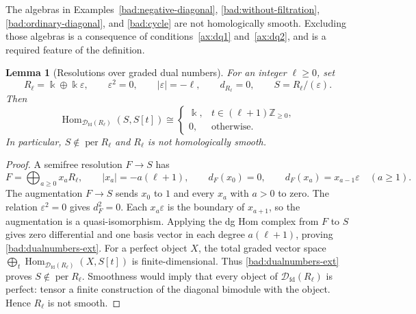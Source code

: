 \documentclass[11pt,a4paper]{article}
\newcommand{\D}{\mathcal D}
\newcommand{\ZZ}{\mathbb{Z}}
\DeclareMathOperator{\fd}{fd}
\DeclareMathOperator{\Hom}{Hom}
\DeclareMathOperator{\per}{per}
\theoremstyle{plain}
\newtheorem{lemma}[theorem]{Lemma}
\theoremstyle{definition}
\numberwithin{equation}{section}
\begin{document}
The algebras in Examples~\ref{bad:negative-diagonal},
\ref{bad:without-filtration}, \ref{bad:ordinary-diagonal}, and
\ref{bad:cycle} are not homologically smooth. Excluding those algebras is a
consequence of conditions~\ref{ax:dq1} and~\ref{ax:dq2}, and is a
required feature of the definition.

\begin{lemma}[Resolutions over graded dual numbers]\label{bad:dualnumbers-resolution}
For an integer $\ell\geq0$, set
\begin{equation}\label{bad:dualnumbers-algebra}
 R_\ell=\Bbbk\oplus\Bbbk\varepsilon,
 \qquad\varepsilon^2=0,\qquad |\varepsilon|=-\ell,
 \qquad d_{R_\ell}=0,\qquad S=R_\ell/(\varepsilon).
\end{equation}
Then
\begin{equation}\label{bad:dualnumbers-ext}
 \Hom_{\D_{\fd}(R_\ell)}(S,S[t])\cong
 \begin{cases}
 \Bbbk,&t\in(\ell+1)\ZZ_{\geq0},\\
 0,&\text{otherwise}.
 \end{cases}
\end{equation}
In particular, $S\notin\per R_\ell$ and $R_\ell$ is not
homologically smooth.
\end{lemma}
\begin{proof}
A semifree resolution $F\to S$ has
\begin{equation}\label{bad:dualnumbers-semifree}
 F=\bigoplus_{a\geq0}x_aR_\ell,\qquad
 |x_a|=-a(\ell+1),\qquad
 d_F(x_0)=0,\qquad d_F(x_a)=x_{a-1}\varepsilon\quad(a\geq1).
\end{equation}
The augmentation $F\to S$ sends $x_0$ to $1$ and every $x_a$ with
$a>0$ to zero. The relation $\varepsilon^2=0$ gives $d_F^2=0$.
Each $x_a\varepsilon$ is the boundary of $x_{a+1}$, so the
augmentation is a quasi-isomorphism. Applying the dg Hom complex
from $F$ to $S$ gives zero differential and one basis vector in each
degree $a(\ell+1)$, proving \eqref{bad:dualnumbers-ext}.
For a perfect object $X$, the total graded vector space
$\bigoplus_t\Hom_{\D_{\fd}(R_\ell)}(X,S[t])$ is finite-dimensional.
Thus \eqref{bad:dualnumbers-ext} proves $S\notin\per R_\ell$.
Smoothness would imply that every object of $\D_{\fd}(R_\ell)$ is
perfect: tensor a finite construction of the diagonal bimodule
with the object. Hence $R_\ell$ is not smooth.
\end{proof}
\end{document}
